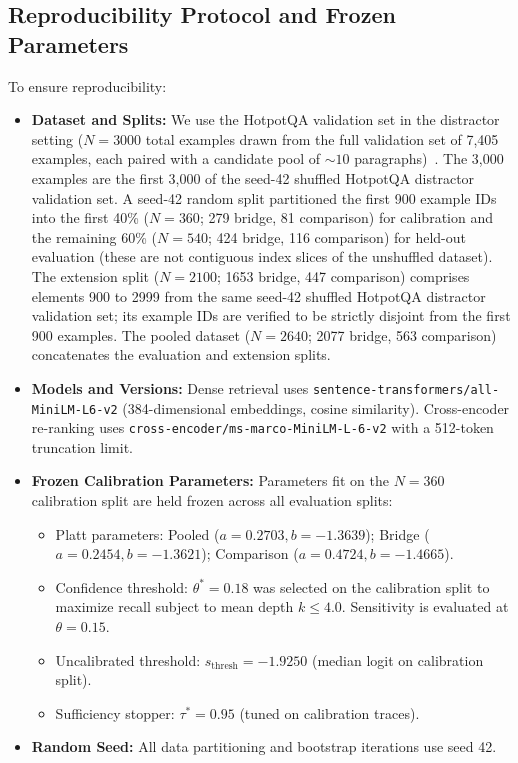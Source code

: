 \documentclass{article}
\begin{document}
\subsection{Reproducibility Protocol and Frozen Parameters}
To ensure reproducibility:
\begin{itemize}
    \item \textbf{Dataset and Splits:} We use the HotpotQA validation set in the distractor setting ($N=3000$ total examples drawn from the full validation set of 7,405 examples, each paired with a candidate pool of $\sim 10$ paragraphs)~\cite{yang2018hotpotqa}. The 3,000 examples are the first 3,000 of the seed-42 shuffled HotpotQA distractor validation set. A seed-42 random split partitioned the first 900 example IDs into the first 40\% ($N=360$; 279 bridge, 81 comparison) for calibration and the remaining 60\% ($N=540$; 424 bridge, 116 comparison) for held-out evaluation (these are not contiguous index slices of the unshuffled dataset). The extension split ($N=2100$; 1653 bridge, 447 comparison) comprises elements 900 to 2999 from the same seed-42 shuffled HotpotQA distractor validation set; its example IDs are verified to be strictly disjoint from the first 900 examples. The pooled dataset ($N=2640$; 2077 bridge, 563 comparison) concatenates the evaluation and extension splits.
    \item \textbf{Models and Versions:} Dense retrieval uses \texttt{sentence-transformers/all-MiniLM-L6-v2} (384-dimensional embeddings, cosine similarity). Cross-encoder re-ranking uses \texttt{cross-encoder/ms-marco-MiniLM-L-6-v2} with a 512-token truncation limit.
    \item \textbf{Frozen Calibration Parameters:} Parameters fit on the $N=360$ calibration split are held frozen across all evaluation splits:
    \begin{itemize}
        \item Platt parameters: Pooled ($a=0.2703, b=-1.3639$); Bridge ($a=0.2454, b=-1.3621$); Comparison ($a=0.4724, b=-1.4665$).
        \item Confidence threshold: $\theta^* = 0.18$ was selected on the calibration split to maximize recall subject to mean depth $k \le 4.0$. Sensitivity is evaluated at $\theta = 0.15$.
        \item Uncalibrated threshold: $s_{\text{thresh}} = -1.9250$ (median logit on calibration split).
        \item Sufficiency stopper: $\tau^* = 0.95$ (tuned on calibration traces).
    \end{itemize}
    \item \textbf{Random Seed:} All data partitioning and bootstrap iterations use seed 42.
\end{itemize}
\end{document}
